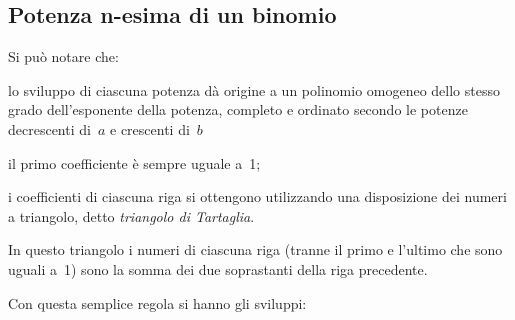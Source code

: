 
\subsection{Potenza n-esima di un binomio}
\label{subsec:11_prodnot_potenzabinomio}

Si può notare che:

\begin{itemize*}
\item lo sviluppo di ciascuna potenza dà origine a un polinomio
omogeneo dello stesso grado dell'esponente della
potenza, completo e ordinato secondo le potenze decrescenti di~\(a\) e 
crescenti di~\(b\)
\item il primo coefficiente è sempre uguale a~1;
\item i coefficienti di ciascuna riga si ottengono utilizzando una
disposizione dei numeri a triangolo, detto \emph{triangolo di Tartaglia}.
\end{itemize*}

\begin{inaccessibleblock}
\begin{minipage}[t]{.49\textwidth}
 \centering 
\end{minipage}
\hfil
 \begin{minipage}[t]{.49\textwidth}
 \centering 
\end{minipage}
\end{inaccessibleblock}

In questo triangolo i numeri di ciascuna riga (tranne il primo e
l'ultimo che sono uguali a~1) sono la somma dei due
soprastanti della riga precedente.

Con questa semplice regola si hanno gli sviluppi:

